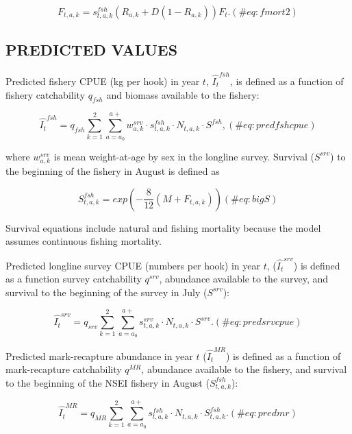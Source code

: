 \documentclass[
]{article}
\begin{document}
\[
\begin{equation}
F_{t,a,k}=s_{t,a,k}^{fsh}(R_{a,k}+D(1-R_{a,k}))F_t.
(\#eq:fmort2)
\end{equation}
\]

\hypertarget{predicted-values}{%
\subsection{PREDICTED VALUES}\label{predicted-values}}

Predicted fishery CPUE (kg per hook) in year \(t\), \(\hat{I_t}^{fsh}\),
is defined as a function of fishery catchability \(q_{fsh}\) and biomass
available to the fishery:

\[
\begin{equation}
\hat{I_t}^{fsh}=q_{fsh}\sum_{k=1}^{2}\sum_{a=a_0}^{a+}w_{a,k}^{srv} \cdot s_{t,a,k}^{fsh} \cdot N_{t,a,k} \cdot S^{fsh},
(\#eq:predfshcpue)
\end{equation}
\]

where \(w_{a,k}^{srv}\) is mean weight-at-age by sex in the longline
survey. Survival (\(S^{srv}\)) to the beginning of the fishery in August
is defined as

\[
\begin{equation}
S_{t,a,k}^{fsh}=exp(-\frac{8}{12}(M+F_{t,a,k}))
(\#eq:bigS)
\end{equation}
\]

Survival equations include natural and fishing mortality because the
model assumes continuous fishing mortality.

Predicted longline survey CPUE (numbers per hook) in year \(t\),
(\(\hat{I_t}^{srv}\)) is defined as a function survey catchability
\(q^{srv}\), abundance available to the survey, and survival to the
beginning of the survey in July (\(S^{srv}\)):

\[
\begin{equation}
\hat{I_t}^{srv}=q_{srv}\sum_{k=1}^{2}\sum_{a=a_0}^{a+}s_{t,a,k}^{srv} \cdot N_{t,a,k} \cdot S^{srv}.
(\#eq:predsrvcpue)
\end{equation}
\]

Predicted mark-recapture abundance in year \(t\) (\(\hat{I_t}^{MR}\)) is
defined as a function of mark-recapture catchability \(q^{MR}\),
abundance available to the fishery, and survival to the beginning of the
NSEI fishery in August (\(S_{t,a,k}^{fsh}\)):

\[
\begin{equation}
\hat{I_t}^{MR}=q_{MR}\sum_{k=1}^{2}\sum_{a=a_0}^{a+}s_{t,a,k}^{fsh} \cdot N_{t,a,k} \cdot S_{t,a,k}^{fsh}.
(\#eq:predmr)
\end{equation}
\]
\end{document}
